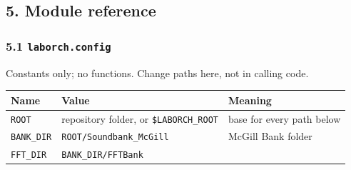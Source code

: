 \documentclass[
  10pt,
]{article}
\begin{document}
\subsection{5. Module reference}

\subsubsection{\texorpdfstring{5.1
\texttt{laborch.config}}{5.1 laborch.config}}

Constants only; no functions. Change paths here, not in
calling code.

\begin{longtable}[]{@{}lll@{}}
\toprule
\begin{minipage}[b]{0.30\columnwidth}\raggedright
Name\strut
\end{minipage} &
\begin{minipage}[b]{0.30\columnwidth}\raggedright
Value\strut
\end{minipage} &
\begin{minipage}[b]{0.30\columnwidth}\raggedright
Meaning\strut
\end{minipage}\tabularnewline
\midrule
\endhead
\begin{minipage}[t]{0.30\columnwidth}\raggedright
\texttt{ROOT}\strut
\end{minipage} &
\begin{minipage}[t]{0.30\columnwidth}\raggedright
repository folder, or \texttt{\$LABORCH\_ROOT}\strut
\end{minipage} &
\begin{minipage}[t]{0.30\columnwidth}\raggedright
base for every path below\strut
\end{minipage}\tabularnewline
\begin{minipage}[t]{0.30\columnwidth}\raggedright
\texttt{BANK\_DIR}\strut
\end{minipage} &
\begin{minipage}[t]{0.30\columnwidth}\raggedright
\texttt{ROOT/Soundbank\_McGill}\strut
\end{minipage} &
\begin{minipage}[t]{0.30\columnwidth}\raggedright
McGill Bank folder\strut
\end{minipage}\tabularnewline
\begin{minipage}[t]{0.30\columnwidth}\raggedright
\texttt{FFT\_DIR}\strut
\end{minipage} &
\begin{minipage}[t]{0.30\columnwidth}\raggedright
\texttt{BANK\_DIR/FFTBank}\strut

\end{minipage}
\end{longtable}
\end{document}
